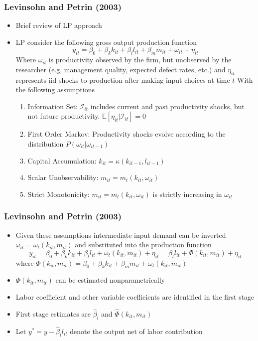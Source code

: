 \documentclass{beamer}
\begin{document}

\begin{frame}
\frametitle{Levinsohn and Petrin (2003)}
\begin{itemize}
	\item Brief review of LP approach	
	\item LP consider the following gross output production function
	\begin{equation}
	y_{it}=\beta_{0}+\beta_{k}k_{it}+\beta_{l}l_{it}+\beta_{m}m_{it}+\omega_{it}+\eta_{it}
	\end{equation}
	Where $\omega_{it}$ is productivity observed by the firm, but unobserved by the researcher (e.g, management quality, expected defect rates, etc.) and $\eta_{it}$ represents iid shocks to production after making input choices at time $t$
	With the following assumptions
	\medskip
	\begin{enumerate}
		\item Information Set: $\mathcal{I}_{it}$ includes current and past productivity shocks, but not future productivity. $\mathbb{E}[\eta_{it}|\mathcal{I}_{it}]=0$
		\item First Order Markov: Productivity shocks evolve according to the distribution $P(\omega_{it}|\omega_{it-1})$
		\item Capital Accumulation: $k_{it}=\kappa(k_{it-1}, l_{it-1})$
		\item Scalar Unobservability: $m_{it}=m_{t}(k_{it}, \omega_{it})$
		\item Strict Monotonicity: $m_{it}=m_{t}(k_{it}, \omega_{it})$ is strictly increasing in $\omega_{it}$
	\end{enumerate}
\end{itemize}
\end{frame}


\begin{frame}
\frametitle{Levinsohn and Petrin (2003)}
\begin{itemize}
	\item Given these assumptions intermediate input demand can be inverted $\omega_{it}=\omega_{t}(k_{it}, m_{it})$ and substituted into the production function
	\begin{equation}
		y_{it}=\beta_{0}+\beta_{k}k_{it}+\beta_{l}l_{it}+\omega_{t}(k_{it}, m_{it})+\eta_{it}=\beta_{l}l_{it}+\Phi(k_{it}, m_{it})+\eta_{it}
	\end{equation}
	where $\Phi(k_{it}, m_{it})=\beta_{0}+\beta_{k}k_{it}+\beta_{m}m_{it}+\omega_{t}(k_{it}, m_{it})$
	\item $\Phi(k_{it}, m_{it})$ can be estimated nonparametrically
	\item Labor coefficient and other variable coefficients are identified in the first stage
	\item First stage estimates are $\hat{\beta}_{l}$ and $\hat{\Phi}(k_{it}, m_{it})$ 
	\item Let $y^{*}=y-\hat{\beta}_{l}l_{it}$ denote the output net of labor contribution
\end{itemize}
\end{frame}
\end{document}
